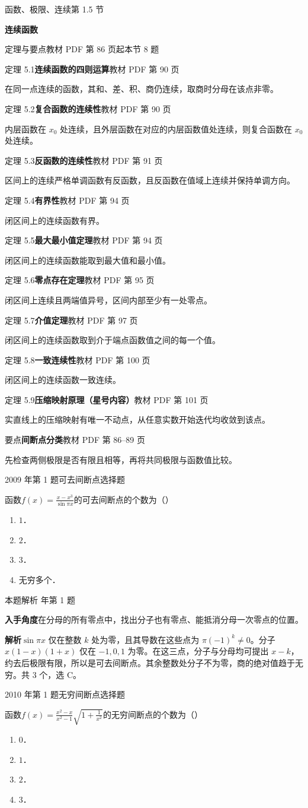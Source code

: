 \documentclass[UTF8,zihao=-4,fontset=fandol]{ctexart}
\newcommand{\SectionHeading}[4]{%
  \clearpage\hypertarget{sec-#1}{}%
  {\small\textcolor{accent}{#2\hfill 第 #1 节}}\par\medskip
  {\LARGE\bfseries #3}\par\smallskip
  {\small\textcolor{muted}{#4}}\par\bigskip}
\newcommand{\Theory}[4]{%
  {\small\textcolor{accent}{#1}\quad\textbf{#3}\hfill\textcolor{muted}{教材 PDF 第 #2 页}}\par
  {\small #4}\par\smallskip}
\newcommand{\pickout}{\hfill（\hspace{1.4em}）}
\newenvironment{abcd}{\begin{enumerate}[label=\textup{(\Alph*)},leftmargin=2.3em,itemsep=1pt,topsep=4pt,parsep=1pt]}{\end{enumerate}}
\newcommand{\QuestionPage}[6]{%
  \par\noindent\begin{minipage}{\linewidth}
  \raggedright
  {\small\textcolor{black!60}{#3\quad #5}\hfill\textcolor{accent}{#2}}\par\smallskip}
\newcommand{\QuestionEnd}{\end{minipage}\par\medskip}
\newcommand{\QuestionPage}[6]{%
  \clearpage
  {\small\textcolor{accent}{#1\hfill #2}}\par\medskip
  {\small\textcolor{black!60}{#3\quad #5\hfill #6}}\par\vspace{9bp}}
\newcommand{\QuestionEnd}{}
\newenvironment{QuestionSolution}[1]{%
  \clearpage
  {\small\textcolor{black!60}{本题解析\quad #1}}\par\medskip
}{\par\clearpage}
\begin{document}
\SectionHeading{1.5}{函数、极限、连续}{连续函数}{定理与要点\quad 教材 PDF 第 86 页起\hfill 本节 8 题}
\Theory{定理 5.1}{90}{连续函数的四则运算}{在同一点连续的函数，其和、差、积、商仍连续，取商时分母在该点非零。}
\Theory{定理 5.2}{90}{复合函数的连续性}{内层函数在 \(x_0\) 处连续，且外层函数在对应的内层函数值处连续，则复合函数在 \(x_0\) 处连续。}
\Theory{定理 5.3}{91}{反函数的连续性}{区间上的连续严格单调函数有反函数，且反函数在值域上连续并保持单调方向。}
\Theory{定理 5.4}{94}{有界性}{闭区间上的连续函数有界。}
\Theory{定理 5.5}{94}{最大最小值定理}{闭区间上的连续函数能取到最大值和最小值。}
\Theory{定理 5.6}{95}{零点存在定理}{闭区间上连续且两端值异号，区间内部至少有一处零点。}
\Theory{定理 5.7}{97}{介值定理}{闭区间上的连续函数取到介于端点函数值之间的每一个值。}
\Theory{定理 5.8}{100}{一致连续性}{闭区间上的连续函数一致连续。}
\Theory{定理 5.9}{101}{压缩映射原理（星号内容）}{实直线上的压缩映射有唯一不动点，从任意实数开始迭代均收敛到该点。}
\Theory{要点}{86--89}{间断点分类}{先检查两侧极限是否有限且相等，再将共同极限与函数值比较。}
\QuestionPage{1.5 连续函数}{选择题}{2009 年第 1 题}{1}{可去间断点}{040 / 234}
函数$f(x) = \frac{x - x^3}{\sin\pi x}$的可去间断点的个数为\pickout{}
\begin{abcd}
\item $1$．
\item $2$．
\item $3$．
\item 无穷多个．
\end{abcd}
\QuestionEnd

\begin{QuestionSolution}{2009 年第 1 题}
\textbf{入手角度}\quad 在分母的所有零点中，找出分子也有零点、能抵消分母一次零点的位置。

\textbf{解析}\quad \(\sin\pi x\) 仅在整数 \(k\) 处为零，且其导数在这些点为 \(\pi(-1)^k\ne0\)。分子 \(x(1-x)(1+x)\) 仅在 \(-1,0,1\) 为零。在这三点，分子与分母均可提出 \(x-k\)，约去后极限有限，所以是可去间断点。其余整数处分子不为零，商的绝对值趋于无穷。共 \(\boxed{3}\) 个，选 C。
\end{QuestionSolution}

\QuestionPage{1.5 连续函数}{选择题}{2010 年第 1 题}{1}{无穷间断点}{041 / 234}
函数$f(x) = \frac{x^2 - x}{x^2 - 1}\sqrt{1 + \frac{1}{x^2}}$的无穷间断点的个数为\pickout{}
\begin{abcd}
\item $0$．
\item $1$．
\item $2$．
\item $3$．
\end{abcd}
\QuestionEnd
\end{document}
